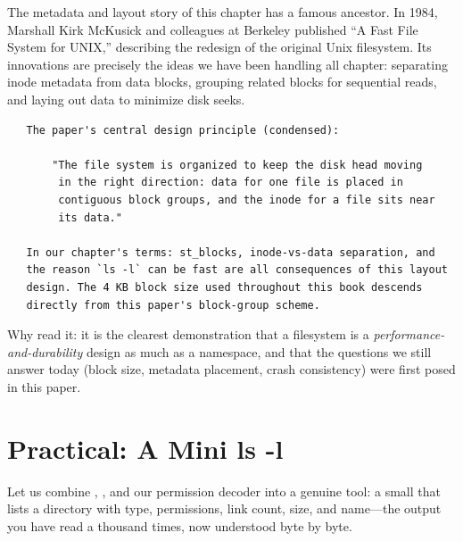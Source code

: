 \begin{researchnote}
The metadata and layout story of this chapter has a famous ancestor.
In 1984, Marshall Kirk McKusick and colleagues at Berkeley published
``A Fast File System for UNIX,'' describing the redesign of the
original Unix filesystem. Its innovations are precisely the ideas we
have been handling all chapter: separating inode metadata from data
blocks, grouping related blocks for sequential reads, and laying out
data to minimize disk seeks.

\begin{verbatim}
   The paper's central design principle (condensed):

       "The file system is organized to keep the disk head moving
        in the right direction: data for one file is placed in
        contiguous block groups, and the inode for a file sits near
        its data."

   In our chapter's terms: st_blocks, inode-vs-data separation, and
   the reason `ls -l` can be fast are all consequences of this layout
   design. The 4 KB block size used throughout this book descends
   directly from this paper's block-group scheme.
\end{verbatim}

Why read it: it is the clearest demonstration that a filesystem is a
\emph{performance-and-durability} design as much as a namespace, and
that the questions we still answer today (block size, metadata
placement, crash consistency) were first posed in this paper.

\end{researchnote}

\section{Practical: A Mini ls -l}

Let us combine , , and our permission
decoder into a genuine tool: a small  that lists a
directory with type, permissions, link count, size, and name---the
output you have read a thousand times, now understood byte by byte.

